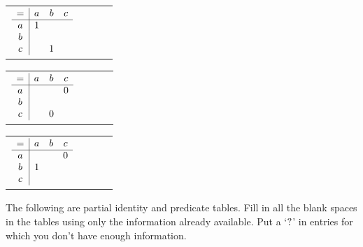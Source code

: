 \documentclass[PHIL101-Textbook.tex]{subfiles}
\begin{document}
\begin{earg}
\item\begin{tabular}{cccc}
	$\begin{array}{c|ccc}
	   = & a & b & c\\ \hline
	   a &1&&\\
	   b &&&\\
	   c &&1&
	 \end{array}$
	 \end{tabular}\medskip\medskip
\item\begin{tabular}{cccc}
	$\begin{array}{c|ccc}
	   = & a & b & c\\ \hline
	   a &&&0\\
	   b &&&\\
	   c &&0&
	 \end{array}$
	 \end{tabular}\medskip\medskip
\item\begin{tabular}{cccc}
	$\begin{array}{c|ccc}
	   = & a & b & c\\ \hline
	   a &&&0\\
	   b &1&&\\
	   c &&&
	 \end{array}$
	 \end{tabular}
\end{earg}


\problempart
\label{pr.identity-predicate-tables}

The following are partial identity and predicate tables. Fill in all the blank spaces in the tables using only the information already available. Put a `$?$' in entries for which you don't have enough information. 
\end{document}
